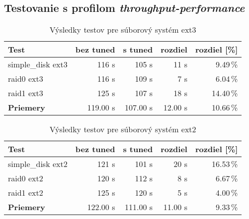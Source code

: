 \subsection{Testovanie s profilom \emph{throughput-performance}}

\begin{table}[H]
\begin{center}
\begin{tabular}{|l|r|r|r|r|}
    \hline
    \textbf{Test} & \textbf{bez tuned} & \textbf{s tuned} & \textbf{rozdiel} & \textbf{rozdiel [\%]} \\ \hline
    simple\_disk ext3 & 116 s & 105 s & 11 s & 9.49\,\% \\
    \hline
    raid0 ext3 & 116 s & 109 s & 7 s & 6.04\,\% \\
    \hline
    raid1 ext3 & 125 s & 107 s & 18 s & 14.40\,\% \\
    \hline
    \textbf{Priemery} & 119.00 s & 107.00 s & 12.00 s & 10.66\,\% \\
    \hline
\end{tabular}
\caption{Výsledky testov pre súborový systém ext3}
\label{tab:results-ext3}
\end{center}
\end{table}

\begin{table}[H]
\begin{center}
\begin{tabular}{|l|r|r|r|r|}
    \hline
    \textbf{Test} & \textbf{bez tuned} & \textbf{s tuned} & \textbf{rozdiel} & \textbf{rozdiel [\%]} \\ \hline
    simple\_disk ext2 & 121 s & 101 s & 20 s & 16.53\,\% \\
    \hline
    raid0 ext2 & 120 s & 112 s & 8 s & 6.67\,\% \\
    \hline
    raid1 ext2 & 125 s & 120 s & 5 s & 4.00\,\% \\
    \hline
    \textbf{Priemery} & 122.00 s & 111.00 s & 11.00 s & 9.33\,\% \\
    \hline
\end{tabular}
\caption{Výsledky testov pre súborový systém ext2}
\label{tab:results-ext2}
\end{center}
\end{table}

